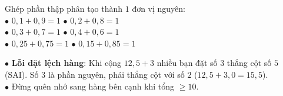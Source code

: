 \documentclass[14pt,a4paper,oneside]{extbook}
\begin{document}
\vspace{3mm}

\noindent
\begin{minipage}[t]{0.54\textwidth}
  \begin{tcolorbox}[
    enhanced,
    title={\footnotesize\bfseries\color{white}\faBolt\ Các cặp phần thập phân ``bù nhau''},
    colback=green!3!white,
    colframe=green!60!black,
    arc=2.5mm, boxrule=0.8pt, top=1.8mm, bottom=1.8mm, left=2.2mm, right=2.2mm
  ]
    \footnotesize
    Ghép phần thập phân tạo thành $1$ đơn vị nguyên:\\
    $\bullet$ $0,1 + 0,9 = 1$ \qquad $\bullet$ $0,2 + 0,8 = 1$\\
    $\bullet$ $0,3 + 0,7 = 1$ \qquad $\bullet$ $0,4 + 0,6 = 1$\\
    $\bullet$ $0,25 + 0,75 = 1$ \quad $\bullet$ $0,15 + 0,85 = 1$
  \end{tcolorbox}
\end{minipage}%
\hfill
\begin{minipage}[t]{0.44\textwidth}
  \begin{tcolorbox}[
    enhanced,
    title={\footnotesize\bfseries\color{white}\faExclamationTriangle\ Mẹo tránh bẫy trắc nghiệm},
    colback=red!2!white,
    colframe=red!70!black,
    arc=2.5mm, boxrule=0.8pt, top=1.8mm, bottom=1.8mm, left=2.2mm, right=2.2mm
  ]
    \footnotesize
    $\bullet$ \textbf{Lỗi đặt lệch hàng}: Khi cộng $12,5 + 3$ nhiều bạn đặt số $3$ thẳng cột số $5$ (SAI). Số $3$ là phần nguyên, phải thẳng cột với số $2$ ($12,5 + 3,0 = 15,5$).\\
    $\bullet$ Đừng quên nhớ sang hàng bên cạnh khi tổng $\ge 10$.
  \end{tcolorbox}
\end{minipage}
\end{document}
